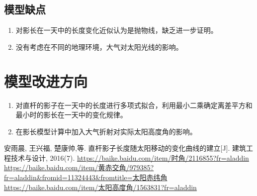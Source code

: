 \documentclass[withoutpreface,bwprint]{cumcmthesis} %
\begin{document}
\subsection{模型缺点}
\begin{enumerate}
	\item 对影长在一天中的长度变化近似认为是抛物线，缺乏进一步证明。
	\item 没有考虑在不同的地理环境，大气对太阳光线的影响。
\end{enumerate}
\section{模型改进方向}
\begin{enumerate}
	\item 对直杆的影子在一天中的长度进行多项式拟合，利用最小二乘确定离差平方和最小时的影长在一天中的变化规律。
	\item 在影长模型计算中加入大气折射对实际太阳高度角的影响。
\end{enumerate}




\begin{thebibliography}{9}%
  安雨晨, 王兴福, 楚康帅,等. 直杆影子长度随太阳移动的变化曲线的建立[J]. 建筑工程技术与设计, 2016(7).
  \url{https://baike.baidu.com/item/时角/2116855?fr=aladdin}
  \url{https://baike.baidu.com/item/黄赤交角/979385?fr=aladdin&fromid=11324443&fromtitle=太阳赤纬角}
  \url{https://baike.baidu.com/item/太阳高度角/1563831?fr=aladdin}
\end{thebibliography}
\end{document}
